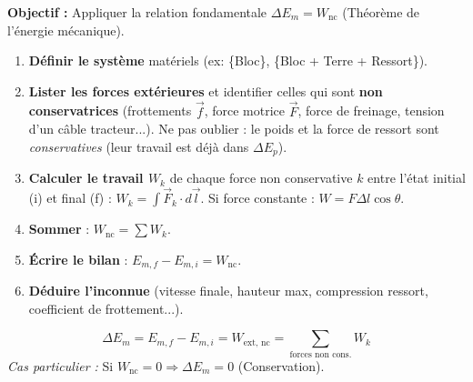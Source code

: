\documentclass[11pt]{article}
\begin{document}
\begin{methode}
    \textbf{Objectif :} Appliquer la relation fondamentale $\Delta E_m = W_{\text{nc}}$ (Théorème de l'énergie mécanique).
    \begin{enumerate}
        \item \textbf{Définir le système} matériels (ex: \{Bloc\}, \{Bloc + Terre + Ressort\}).
        \item \textbf{Lister les forces extérieures} et identifier celles qui sont \textbf{non conservatrices} (frottements $\vec{f}$, force motrice $\vec{F}$, force de freinage, tension d'un câble tracteur...). Ne pas oublier : le poids et la force de ressort sont \emph{conservatives} (leur travail est déjà dans $\Delta E_p$).
        \item \textbf{Calculer le travail $W_k$} de chaque force non conservative $k$ entre l'état initial (i) et final (f) : $W_k = \int \vec{F}_k \cdot d\vec{l}$. Si force constante : $W = F \Delta l \cos\theta$.
        \item \textbf{Sommer} : $W_{\text{nc}} = \sum W_k$.
        \item \textbf{Écrire le bilan} : $E_{m,f} - E_{m,i} = W_{\text{nc}}$.
        \item \textbf{Déduire l'inconnue} (vitesse finale, hauteur max, compression ressort, coefficient de frottement...).
    \end{enumerate}
    \begin{aretenir}
        \[ \Delta E_m = E_{m,f} - E_{m,i} = W_{\text{ext, nc}} = \sum_{\text{forces non cons.}} W_k \]
        \emph{Cas particulier :} Si $W_{\text{nc}} = 0 \Rightarrow \Delta E_m = 0$ (Conservation).
    \end{aretenir}
\end{methode}
\end{document}
